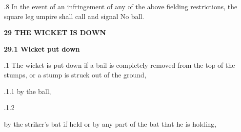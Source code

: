 \documentclass[12pt]{article}
\begin{document}
\vspace{\baselineskip}
\begin{adjustwidth}{0.5in}{0.11in}
{\fontsize{9pt}{10.8pt}.8 \tabto{0.49in} In the event of an infringement of any of the above fielding restrictions, the square leg umpire shall call and signal No ball.\par}\par

\end{adjustwidth}


\vspace{\baselineskip}
{\fontsize{16pt}{19.2pt}\selectfont \textbf{29 THE WICKET IS DOWN}\par}\par


\vspace{\baselineskip}
{\fontsize{11pt}{13.2pt}\selectfont \textbf{29.1 \tabto{0.47in} Wicket put down}\par}\par


\vspace{\baselineskip}
\begin{adjustwidth}{0.5in}{0.04in}
{\fontsize{9pt}{10.8pt}.1 \tabto{0.49in} The wicket is put down if a bail is completely removed from the top of the stumps, or a stump is struck out of the ground,\par}\par

\end{adjustwidth}


\vspace{\baselineskip}
\begin{adjustwidth}{0.49in}{0.0in}
{\fontsize{9pt}{10.8pt}.1.1 \tabto{1.17in} by the ball,\par}\par

\end{adjustwidth}


\vspace{\baselineskip}
\begin{adjustwidth}{0.49in}{0.0in}
{\fontsize{9pt}{10.8pt}.1.2 \tabto{1.17in} {\fontsize{8pt}{9.6pt}\selectfont by the striker’s bat if held or by any part of the bat that he is holding,\par}\par}\par

\end{adjustwidth}
\end{document}
